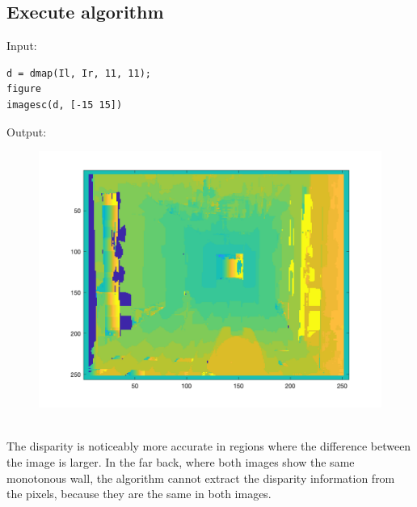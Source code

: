 \documentclass[12pt, a4paper]{article}
\begin{document}
\subsection{Execute algorithm}
Input:
\begin{verbatim}
d = dmap(Il, Ir, 11, 11);
figure
imagesc(d, [-15 15])
\end{verbatim}
Output:
\vspace{-1mm}
\begin{figure}[H]
	\centering
	\includegraphics[width=\textwidth]{fig19.png}
\end{figure}
~\\
The disparity is noticeably more accurate in regions where the difference between the image is larger. In the far back, where both images show the same monotonous wall, the algorithm cannot extract the disparity information from the pixels, because they are the same in both images.
\newpage
\end{document}
